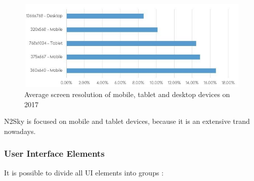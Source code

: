 \begin{figure}[htbp]
\begin{center}
  \includegraphics[scale=0.65]{components/3/components/screen.png}
  \caption{Average screen resolution of mobile, tablet and desktop devices on 2017}
  \label{fig:screen}
\end{center}
\end{figure}

N2Sky is focused on mobile and tablet devices, because it is an extensive trand nowadays. 

\subsubsection{User Interface Elements}\label{User Interface Elements}

It is possible to divide all UI elements into groups \cite{intelligent_support}:


